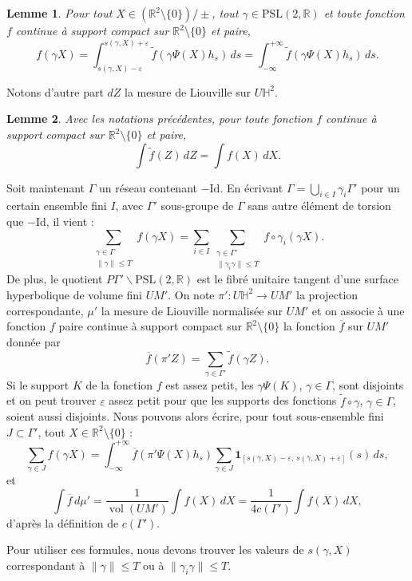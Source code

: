 \documentclass[11pt]{article}
\newtheorem{lemme}{Lemme}
\theoremstyle{remark}
\newcommand{\R}{\mathbb{R}}
\newcommand{\PSL}{\mathrm{PSL}}
\newcommand{\Id}{\mathrm{Id}}
\newcommand{\vol}{\operatorname{vol}}
\begin{document}
\begin{lemme}
Pour tout $X\in(\R^2\setminus\{0\})/\pm$, tout $\gamma\in\PSL(2,\R)$ et toute fonction $f$ continue à support compact sur $\R^2\setminus\{0\}$ et paire,
\[
f(\gamma X)=\int_{s(\gamma,X)-\varepsilon}^{s(\gamma,X)+\varepsilon}
\widetilde f(\gamma\Psi(X)h_s)\,ds
=\int_{-\infty}^{+\infty}\widetilde f(\gamma\Psi(X)h_s)\,ds.
\]
\end{lemme}

Notons d'autre part $dZ$ la mesure de Liouville sur $U\mathbb H^2$.

\begin{lemme}
Avec les notations précédentes, pour toute fonction $f$ continue à support compact sur $\R^2\setminus\{0\}$ et paire,
\[
\int\widetilde f(Z)\,dZ=\int f(X)\,dX.
\]
\end{lemme}

Soit maintenant $\Gamma$ un réseau contenant $-\Id$. En écrivant
$\Gamma=\bigcup_{i\in I}\gamma_i\Gamma'$ pour un certain ensemble fini $I$, avec $\Gamma'$ sous-groupe de $\Gamma$ sans autre élément de torsion que $-\Id$, il vient :
\[
\sum_{\substack{\gamma\in\Gamma\\ \|\gamma\|\le T}} f(\gamma X)
=\sum_{i\in I}\sum_{\substack{\gamma\in\Gamma'\\ \|\gamma_i\gamma\|\le T}} f\circ\gamma_i(\gamma X).
\]
De plus, le quotient $P\Gamma'\backslash\PSL(2,\R)$ est le fibré unitaire tangent d'une surface hyperbolique de volume fini $UM'$. On note $\pi':U\mathbb H^2\to UM'$ la projection correspondante, $\mu'$ la mesure de Liouville normalisée sur $UM'$ et on associe à une fonction $f$ paire continue à support compact sur $\R^2\setminus\{0\}$ la fonction $\overline f$ sur $UM'$ donnée par
\[
\overline f(\pi' Z)=\sum_{\gamma\in\Gamma'}\widetilde f(\gamma Z).
\]
Si le support $K$ de la fonction $f$ est assez petit, les $\gamma\Psi(K)$, $\gamma\in\Gamma$, sont disjoints et on peut trouver $\varepsilon$ assez petit pour que les supports des fonctions $\widetilde f\circ\gamma$, $\gamma\in\Gamma$, soient aussi disjoints. Nous pouvons alors écrire, pour tout sous-ensemble fini $J\subset\Gamma'$, tout $X\in\R^2\setminus\{0\}$ :
\[
\sum_{\gamma\in J}f(\gamma X)
=\int_{-\infty}^{+\infty}\overline f(\pi'\Psi(X)h_s)
\sum_{\gamma\in J}\mathbf 1_{[s(\gamma,X)-\varepsilon,\,s(\gamma,X)+\varepsilon]}(s)\,ds,
\]
et
\[
\int \overline f\,d\mu'
=\frac{1}{\vol(UM')}\int f(X)\,dX
=\frac{1}{4c(\Gamma')}\int f(X)\,dX,
\]
d'après la définition de $c(\Gamma')$.

Pour utiliser ces formules, nous devons trouver les valeurs de $s(\gamma,X)$ correspondant à $\|\gamma\|\le T$ ou à $\|\gamma_i\gamma\|\le T$.
\end{document}
